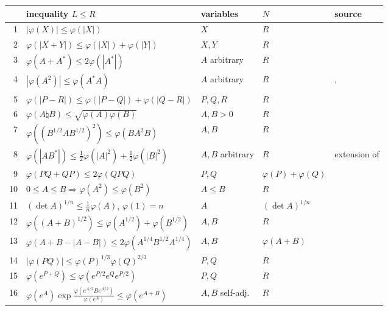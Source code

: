 \documentclass[11pt]{article}
\theoremstyle{plain}
\theoremstyle{definition}
\theoremstyle{remark}
\begin{document}
\begin{table}[h]
\centering\small
\setlength{\tabcolsep}{3pt}
\begin{tabular}{rllll}
\toprule
 & inequality $L\le R$ & variables & $N$ & source\\
\midrule
1 & $|\varphi(X)|\le\varphi(|X|)$ & $X$ & $R$ & \cite{gardner1979}\\
2 & $\varphi(|X+Y|)\le\varphi(|X|)+\varphi(|Y|)$ & $X,Y$ & $R$ & \cite{gardner1979,stolyarov2002}\\
3 & $\varphi(A+A^*)\le2\varphi(|A^*|)$ & $A$ arbitrary & $R$ & \cite{bikchentaev2019abed}\\
4 & $|\varphi(A^2)|\le\varphi(A^*A)$ & $A$ arbitrary & $R$ & \cite[Thm.~1, $k=2$]{petz1988}, \cite{bikchentaev2026moslehian}\\
5 & $\varphi(|P-R|)\le\varphi(|P-Q|)+\varphi(|Q-R|)$ & $P,Q,R$ & $R$ & \cite{bikchentaev2019metric}\\
6 & $\varphi(A\natural B)\le\sqrt{\varphi(A)\varphi(B)}$ & $A,B>0$ & $R$ & \cite{bikchentaev2026sgm}\\
7 & $\varphi((B^{1/2}AB^{1/2})^2)\le\varphi(BA^2B)$ & $A,B$ & $R$ & \cite[Lemma~2, $r=2$, $p=1$]{bikchentaev2011pb}\\
8 & $\varphi(|AB^*|)\le\frac12\varphi(|A|^2)+\frac12\varphi(|B|^2)$ & $A,B$ arbitrary & $R$ & extension of \cite{bikchentaev2005young}\\
9 & $\varphi(PQ+QP)\le2\varphi(QPQ)$ & $P,Q$ & $\varphi(P)+\varphi(Q)$ & \cite{bikchentaev2019abed}\\
10 & $0\le A\le B\Rightarrow\varphi(A^2)\le\varphi(B^2)$ & $A\le B$ & $R$ & \cite{bikchentaev2007mono,sano2006}\\
11 & $(\det A)^{1/n}\le\frac1n\varphi(A)$, $\varphi(1)=n$ & $A$ & $(\det A)^{1/n}$ & \cite[Thm.~3(iii)]{bikchentaev2020det}\\
12 & $\varphi((A+B)^{1/2})\le\varphi(A^{1/2})+\varphi(B^{1/2})$ & $A,B$ & $R$ & \cite[Cor.~1]{tikhonov2005}\\
13 & $\varphi(A+B-|A-B|)\le2\varphi(A^{1/4}B^{1/2}A^{1/4})$ & $A,B$ & $\varphi(A+B)$ & \cite[Lemma~3.1]{hoa2013}\\
14 & $|\varphi(PQ)|\le\varphi(P)^{1/3}\varphi(Q)^{2/3}$ & $P,Q$ & $R$ & \cite[Thm.~2(i)]{bikchentaev2011mn}\\
15 & $\varphi(e^{P+Q})\le\varphi(e^{P/2}e^Qe^{P/2})$ & $P,Q$ & $R$ & \cite[Thm.~2(iv)]{bikchentaev2011mn}\\
16 & $\varphi(e^A)\exp\frac{\varphi(e^{A/2}Be^{A/2})}{\varphi(e^A)}\le\varphi(e^{A+B})$ & $A,B$ self-adj.\ & $R$ &

\end{tabular}
\end{table}
\end{document}
